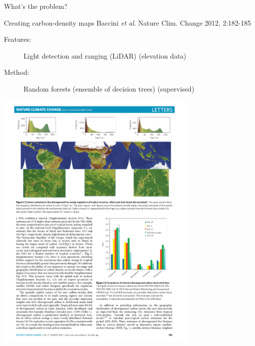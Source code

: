 \documentclass[pdf]{beamer}
\begin{document}
\begin{frame}{What's the problem?}
\begin{exampleblock}{Creating carbon-density maps \vskip-1mm{\tiny Baccini \textit{et al}. Nature Clim. Change 2012, 2:182-185}}
\begin{description}
	\item[Features:] Light detection and ranging (LiDAR) (elevation data)
	\item[Method:] Random forests (ensemble of decision trees) (supervised)
\end{description}
\begin{center}
	\includegraphics[width=0.74\textwidth]{baccini.pdf}
\end{center}
\end{exampleblock}
\end{frame}
\end{document}
